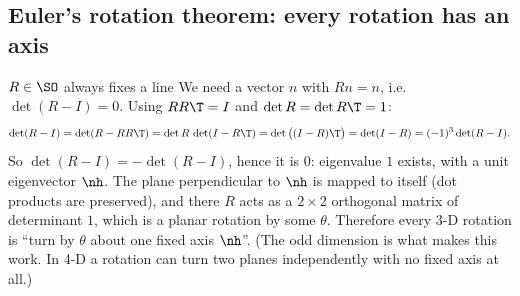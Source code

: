 \subsection{Euler's rotation theorem: every rotation has an axis}\label{sec:rot:euler-s-rotation}
\begin{deriv}{$R\in\SO$ always fixes a line}
We need a vector $n$ with $Rn=n$, i.e.\ $\det(R-I)=0$. Using $RR\T=I$ and $\det R=\det R\T=1$:
\[
\det(R-I)=\det(R-RR\T)=\det R\,\det(I-R\T)=\det\big((I-R)\T\big)=\det(I-R)=(-1)^3\det(R-I).
\]
So $\det(R-I)=-\det(R-I)$, hence it is $0$: eigenvalue $1$ exists, with a unit eigenvector $\nh$. The plane perpendicular to $\nh$ is mapped to itself (dot products are preserved), and there $R$ acts as a $2\times2$ orthogonal matrix of determinant $1$, which is a planar rotation by some $\theta$. Therefore every 3-D rotation is ``turn by $\theta$ about one fixed axis $\nh$''. (The odd dimension is what makes this work. In 4-D a rotation can turn two planes independently with no fixed axis at all.)
\end{deriv}
